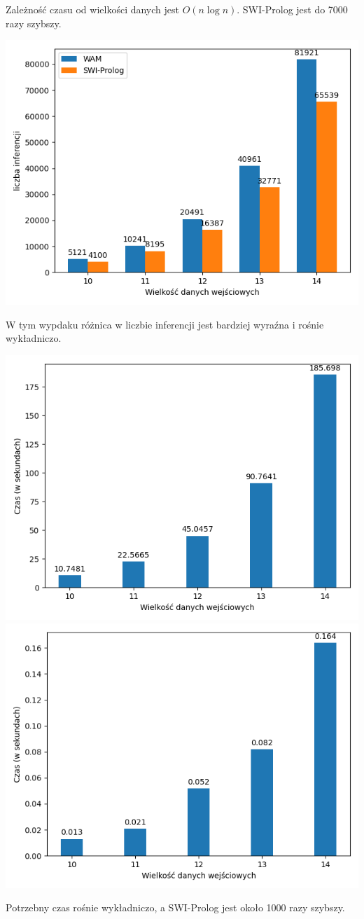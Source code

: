 Zależność czasu od wielkości danych jest $O(n\log n)$. SWI-Prolog jest do 7000 razy szybszy.

\includegraphics{subsi.png}

W tym wypdaku różnica w liczbie inferencji jest bardziej wyraźna i rośnie wykładniczo.

\includegraphics{substw.png}
\includegraphics{substs.png}

Potrzebny czas rośnie wykładniczo, a SWI-Prolog jest około 1000 razy szybszy.

